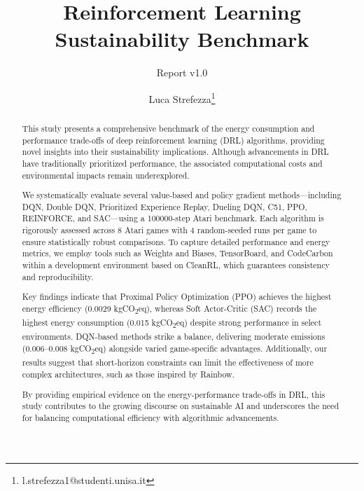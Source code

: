 \documentclass[12pt,a4paper,oneside,titlepage,abstract]{scrartcl}
\begin{document}
	\titlehead{RLSB}
	\subject{Software Engineering for Artificial Intelligence}
	\title{Reinforcement Learning Sustainability Benchmark}
	\subtitle{Report v1.0}
	\author{Luca Strefezza\thanks{l.strefezza1@studenti.unisa.it}}
	\maketitle
	
\begin{abstract}
	This study presents a comprehensive benchmark of the energy consumption and performance trade-offs of deep reinforcement learning (DRL) algorithms, providing novel insights into their sustainability implications. Although advancements in DRL have traditionally prioritized performance, the associated computational costs and environmental impacts remain underexplored.
	
	We systematically evaluate several value-based and policy gradient methods—including DQN, Double DQN, Prioritized Experience Replay, Dueling DQN, C51, PPO, REINFORCE, and SAC—using a \num{100000}-step Atari benchmark. Each algorithm is rigorously assessed across \num{8} Atari games with \num{4} random-seeded runs per game to ensure statistically robust comparisons. To capture detailed performance and energy metrics, we employ tools such as Weights and Biases, TensorBoard, and CodeCarbon within a development environment based on CleanRL, which guarantees consistency and reproducibility.
	
	Key findings indicate that Proximal Policy Optimization (PPO) achieves the highest energy efficiency (\num{0.0029} kgCO\textsubscript{2}eq), whereas Soft Actor-Critic (SAC) records the highest energy consumption (\num{0.015} kgCO\textsubscript{2}eq) despite strong performance in select environments. DQN-based methods strike a balance, delivering moderate emissions (\num{0.006}--\num{0.008} kgCO\textsubscript{2}eq) alongside varied game-specific advantages. Additionally, our results suggest that short-horizon constraints can limit the effectiveness of more complex architectures, such as those inspired by Rainbow.
	
	By providing empirical evidence on the energy-performance trade-offs in DRL, this study contributes to the growing discourse on sustainable AI and underscores the need for balancing computational efficiency with algorithmic advancements.
\end{abstract}

	
	{
		\hypersetup{linkcolor=black}
		\tableofcontents
		\listoftables
		\listoffigures
	}
	
	
	
	
	
	
	
		
	\printbibliography[heading=bibintoc]
	
\end{document}
